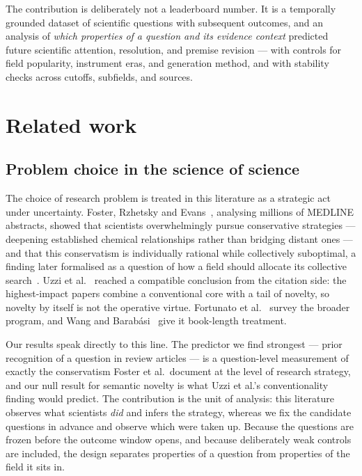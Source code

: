 \documentclass[11pt]{article}
\begin{document}
The contribution is deliberately not a leaderboard number. It is a
temporally grounded dataset of scientific questions with subsequent
outcomes, and an analysis of \emph{which properties of a question and its
evidence context} predicted future scientific attention, resolution, and
premise revision --- with controls for field popularity, instrument eras,
and generation method, and with stability checks across cutoffs,
subfields, and sources.

\section{Related work}

\subsection{Problem choice in the science of science}

The choice of research problem is treated in this literature as a strategic
act under uncertainty. Foster, Rzhetsky and Evans~\cite{foster2015},
analysing millions of MEDLINE abstracts, showed that scientists
overwhelmingly pursue conservative strategies --- deepening established
chemical relationships rather than bridging distant ones --- and that this
conservatism is individually rational while collectively suboptimal, a
finding later formalised as a question of how a field should allocate its
collective search~\cite{rzhetsky2015}. Uzzi et al.~\cite{uzzi2013} reached a
compatible conclusion from the citation side: the highest-impact papers
combine a conventional core with a tail of novelty, so novelty by itself is
not the operative virtue. Fortunato et al.~\cite{fortunato2018} survey the
broader program, and Wang and Barabási~\cite{wang2021} give it book-length
treatment.

Our results speak directly to this line. The predictor we find strongest ---
prior recognition of a question in review articles --- is a question-level
measurement of exactly the conservatism Foster et al.\ document at the level
of research strategy, and our null result for semantic novelty is what Uzzi
et al.'s conventionality finding would predict. The contribution is the unit
of analysis: this literature observes what scientists \emph{did} and infers
the strategy, whereas we fix the candidate questions in advance and observe
which were taken up. Because the questions are frozen before the outcome
window opens, and because deliberately weak controls are included, the
design separates properties of a question from properties of the field it
sits in.
\end{document}
